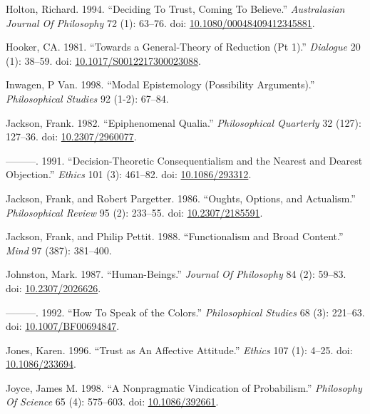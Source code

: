 \documentclass[
  10pt,
  letterpaper,
  DIV=11,
  numbers=noendperiod,
  twoside]{scrartcl}
\newlength{\cslhangindent}
\newenvironment{CSLReferences}[2] %
 {\begin{list}{}{%
  \setlength{\itemindent}{0pt}
  \setlength{\leftmargin}{0pt}
  \setlength{\parsep}{0pt}
  \ifodd #1
   \setlength{\leftmargin}{\cslhangindent}
   \setlength{\itemindent}{-1\cslhangindent}
  \fi
  \setlength{\itemsep}{#2\baselineskip}}}
 {\end{list}}
\begin{document}
\begin{CSLReferences}{1}{0}
Holton, Richard. 1994. {``Deciding To Trust, Coming To Believe.''}
\emph{Australasian Journal Of Philosophy} 72 (1): 63--76. doi:
\href{https://doi.org/10.1080/00048409412345881}{10.1080/00048409412345881}.

Hooker, CA. 1981. {``Towards a General-Theory of Reduction (Pt 1).''}
\emph{Dialogue} 20 (1): 38--59. doi:
\href{https://doi.org/10.1017/S0012217300023088}{10.1017/S0012217300023088}.

Inwagen, P Van. 1998. {``Modal Epistemology (Possibility Arguments).''}
\emph{Philosophical Studies} 92 (1-2): 67--84.

Jackson, Frank. 1982. {``Epiphenomenal Qualia.''} \emph{Philosophical
Quarterly} 32 (127): 127--36. doi:
\href{https://doi.org/10.2307/2960077}{10.2307/2960077}.

---------. 1991. {``Decision-Theoretic Consequentialism and the Nearest
and Dearest Objection.''} \emph{Ethics} 101 (3): 461--82. doi:
\href{https://doi.org/10.1086/293312}{10.1086/293312}.

Jackson, Frank, and Robert Pargetter. 1986. {``Oughts, Options, and
Actualism.''} \emph{Philosophical Review} 95 (2): 233--55. doi:
\href{https://doi.org/10.2307/2185591}{10.2307/2185591}.

Jackson, Frank, and Philip Pettit. 1988. {``Functionalism and Broad
Content.''} \emph{Mind} 97 (387): 381--400.

Johnston, Mark. 1987. {``Human-Beings.''} \emph{Journal Of Philosophy}
84 (2): 59--83. doi:
\href{https://doi.org/10.2307/2026626}{10.2307/2026626}.

---------. 1992. {``How To Speak of the Colors.''} \emph{Philosophical
Studies} 68 (3): 221--63. doi:
\href{https://doi.org/10.1007/BF00694847}{10.1007/BF00694847}.

Jones, Karen. 1996. {``Trust as An Affective Attitude.''} \emph{Ethics}
107 (1): 4--25. doi:
\href{https://doi.org/10.1086/233694}{10.1086/233694}.

Joyce, James M. 1998. {``A Nonpragmatic Vindication of Probabilism.''}
\emph{Philosophy Of Science} 65 (4): 575--603. doi:
\href{https://doi.org/10.1086/392661}{10.1086/392661}.


\end{CSLReferences}
\end{document}
